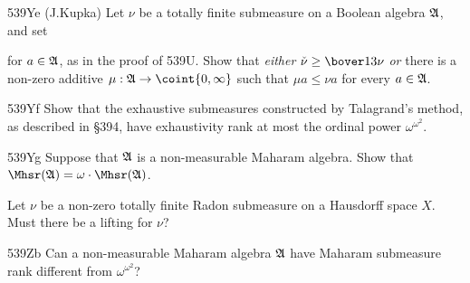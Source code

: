 {\spheader 539Ye (J.Kupka) Let $\nu$ be a
totally finite submeasure on a Boolean algebra $\frak A$, and set


\noindent for $a\in\frak A$, as in the proof of 539U.   Show that {\it
either} $\check\nu\ge\bover13\nu$ {\it or} there is a non-zero additive
$\mu:\frak A\to\coint{0,\infty}$ such that $\mu a\le\nu a$ for every
$a\in\frak A$.  

\spheader 539Yf Show that the exhaustive submeasures constructed by
Talagrand's method, as described in \S394,
have exhaustivity rank at most the ordinal power $\omega^{\omega^2}$.

\spheader 539Yg
Suppose that $\frak A$ is a non-measurable Maharam algebra.
Show that $\Mhsr(\frak A)=\omega\cdot\Mhsr(\frak A)$.
}%

Let $\nu$ be a non-zero totally finite Radon submeasure on a Hausdorff
space $X$.   Must there be a lifting for $\nu$?

\spheader 539Zb Can a non-measurable Maharam algebra $\frak A$ have
Maharam submeasure rank different from $\omega^{\omega^2}$?

